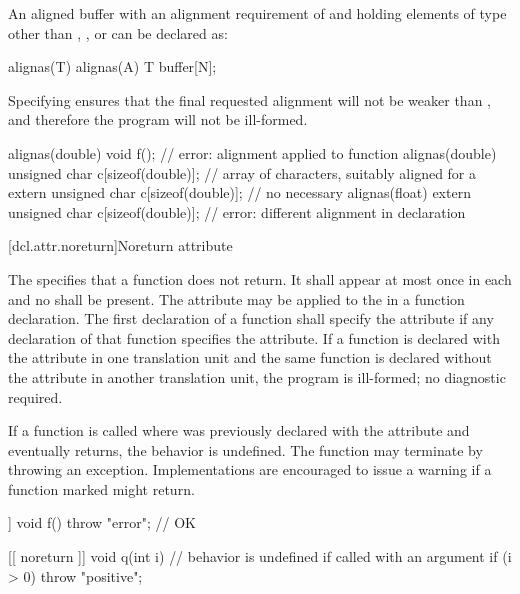 \pnum
\enterexample An aligned buffer with an alignment requirement
of  and holding  elements of type  other than
, , or 
can be declared as:

\begin{codeblock}
alignas(T) alignas(A) T buffer[N];
\end{codeblock}
Specifying  ensures
that the final requested alignment will not be weaker than ,
and therefore the program will not be ill-formed.
\exitexample

\pnum
\enterexample
\begin{codeblock}
alignas(double) void f();                         // error: alignment applied to function
alignas(double) unsigned char c[sizeof(double)];  // array of characters, suitably aligned for a 
extern unsigned char c[sizeof(double)];           // no  necessary
alignas(float)
  extern unsigned char c[sizeof(double)];         // error: different alignment in declaration
\end{codeblock}
\exitexample

[dcl.attr.noreturn]{Noreturn attribute}%

\pnum
The   specifies that a function does not return. It
shall appear at most once in each  and no
 shall be present. The attribute may be applied to the
 in a function declaration. The first declaration of a function shall
specify the  attribute if any declaration of that function specifies the
 attribute. If a function is declared with the  attribute in one
translation unit and the same function is declared without the  attribute in another
translation unit, the program is ill-formed; no diagnostic required.

\pnum
If a function  is called where  was previously declared with the 
attribute and  eventually returns, the behavior is undefined. \enternote The function may
terminate by throwing an exception. \exitnote \enternote Implementations are encouraged to issue a
warning if a function marked \tcode{[[noreturn]]} might return. \exitnote

\pnum
\enterexample
\begin{codeblock}
[[ noreturn ]] void f() {
  throw "error";        // OK
}

[[ noreturn ]] void q(int i) { // behavior is undefined if called with an argument 
  if (i > 0)
    throw "positive";
}
\end{codeblock}
\exitexample

